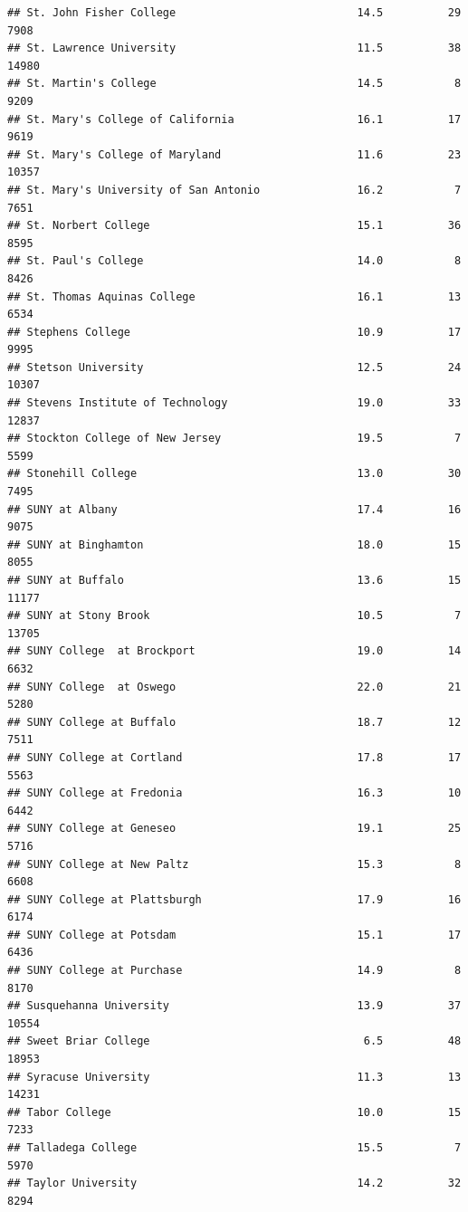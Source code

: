 \documentclass[
]{article}
\begin{document}
\begin{verbatim}
## St. John Fisher College                            14.5          29   7908
## St. Lawrence University                            11.5          38  14980
## St. Martin's College                               14.5           8   9209
## St. Mary's College of California                   16.1          17   9619
## St. Mary's College of Maryland                     11.6          23  10357
## St. Mary's University of San Antonio               16.2           7   7651
## St. Norbert College                                15.1          36   8595
## St. Paul's College                                 14.0           8   8426
## St. Thomas Aquinas College                         16.1          13   6534
## Stephens College                                   10.9          17   9995
## Stetson University                                 12.5          24  10307
## Stevens Institute of Technology                    19.0          33  12837
## Stockton College of New Jersey                     19.5           7   5599
## Stonehill College                                  13.0          30   7495
## SUNY at Albany                                     17.4          16   9075
## SUNY at Binghamton                                 18.0          15   8055
## SUNY at Buffalo                                    13.6          15  11177
## SUNY at Stony Brook                                10.5           7  13705
## SUNY College  at Brockport                         19.0          14   6632
## SUNY College  at Oswego                            22.0          21   5280
## SUNY College at Buffalo                            18.7          12   7511
## SUNY College at Cortland                           17.8          17   5563
## SUNY College at Fredonia                           16.3          10   6442
## SUNY College at Geneseo                            19.1          25   5716
## SUNY College at New Paltz                          15.3           8   6608
## SUNY College at Plattsburgh                        17.9          16   6174
## SUNY College at Potsdam                            15.1          17   6436
## SUNY College at Purchase                           14.9           8   8170
## Susquehanna University                             13.9          37  10554
## Sweet Briar College                                 6.5          48  18953
## Syracuse University                                11.3          13  14231
## Tabor College                                      10.0          15   7233
## Talladega College                                  15.5           7   5970
## Taylor University                                  14.2          32   8294

\end{verbatim}
\end{document}

